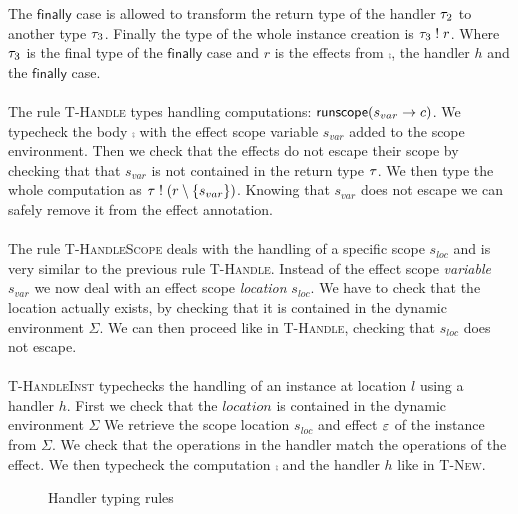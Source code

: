 {The $\mathsf{finally}$ case is allowed to transform the return type of the handler $\tau_2$ to another type $\tau_3$.
Finally the type of the whole instance creation is $\tau_3 \; ! \; r$.
Where $\tau_3$ is the final type of the $\mathsf{finally}$ case and $r$ is the effects from $\comp$, the handler $h$ and the $\mathsf{finally}$ case.
\\\\
The rule \textsc{T-Handle} types handling computations: $\mathsf{runscope} ( s_{var} \rightarrow c )$.
We typecheck the body $\comp$ with the effect scope variable $s_{var}$ added to the scope environment.
Then we check that the effects do not escape their scope by checking that that $s_{var}$ is not contained in the return type $\tau$.
We then type the whole computation as $\tau \; ! \; (r \setminus \{ s_{var} \})$.
Knowing that $s_{var}$ does not escape we can safely remove it from the effect annotation.
\\\\
The rule \textsc{T-HandleScope} deals with the handling of a specific scope $s_{loc}$ and is very similar to the previous rule \textsc{T-Handle}.
Instead of the effect scope \emph{variable} $s_{var}$ we now deal with an effect scope \emph{location} $s_{loc}$.
We have to check that the location actually exists, by checking that it is contained in the dynamic environment $\Sigma$.
We can then proceed like in \textsc{T-Handle}, checking that $s_{loc}$ does not escape.
\\\\
\textsc{T-HandleInst} typechecks the handling of an instance at location $l$ using a handler $h$.
First we check that the $location$ is contained in the dynamic environment $\Sigma$
We retrieve the scope location $s_{loc}$ and effect $\varepsilon$ of the instance from $\Sigma$.
We check that the operations in the handler match the operations of the effect.
We then typecheck the computation $\comp$ and the handler $h$ like in \textsc{T-New}.

\begin{figure}[h]
\caption{Handler typing rules}
\centering
{}
\end{figure}

}

